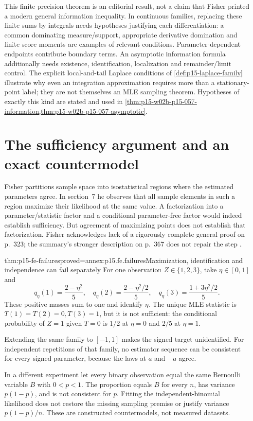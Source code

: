 This finite precision theorem is an editorial result, not a claim that
Fisher printed a modern general information inequality. In continuous
families, replacing these finite sums by integrals needs hypotheses
justifying each differentiation: a common dominating measure/support,
appropriate derivative domination and finite score moments are examples
of relevant conditions. Parameter-dependent endpoints contribute boundary
terms. An asymptotic information formula additionally needs existence,
identification, localization and remainder/limit control. The explicit
local-and-tail Laplace conditions of \cref{def:p15-laplace-family}
illustrate why even an integration approximation requires more than a
stationary-point label; they are not themselves an MLE sampling theorem.
Hypotheses of exactly this kind are stated and used in
\cref{thm:p15-w02b-p15-057-information,thm:p15-w02b-p15-057-asymptotic}.

\section{The sufficiency argument and an exact countermodel}

Fisher partitions sample space into isostatistical regions where the
estimated parameters agree. In section~7 he observes that all sample
elements in such a region maximize their likelihood at the same value.
A factorization into a parameter/statistic factor and a conditional
parameter-free factor would indeed establish sufficiency. But agreement
of maximizing points does not establish that factorization. Fisher
acknowledges lack of a rigorously complete general proof on p.~323;
the summary's stronger description on p.~367 does not repair the step
\cite[pp.~323,330--331,367]{Fisher1922Foundations}.

\begin{hbtheorem}{thm:p15-fe-failures}{proved=annex:p15.fe.failures}{Maximization, identification and independence can fail separately}
For one observation \(Z\in\{1,2,3\}\), take \(\eta\in[0,1]\) and
\[
 q_\eta(1)=\frac{2-\eta^2}{5},\quad
 q_\eta(2)=\frac{2-\eta^2/2}{5},\quad
 q_\eta(3)=\frac{1+3\eta^2/2}{5}.
\]
These positive masses sum to one and identify \(\eta\).
The unique MLE statistic is \(T(1)=T(2)=0,T(3)=1\), but it is not
sufficient: the conditional probability of \(Z=1\) given \(T=0\)
is \(1/2\) at \(\eta=0\) and \(2/5\) at \(\eta=1\).

Extending the same family to \([-1,1]\) makes the signed target
unidentified. For independent repetitions of that family, no estimator
sequence can be consistent for every signed
parameter, because the laws at \(a\) and \(-a\) agree.

In a different experiment let every binary observation equal the same
Bernoulli variable \(B\) with \(0<p<1\). The proportion equals \(B\)
for every \(n\), has variance \(p(1-p)\), and is not consistent for
\(p\). Fitting the independent-binomial likelihood does not restore
the missing sampling premise or justify variance \(p(1-p)/n\).
These are constructed countermodels, not measured datasets.
\end{hbtheorem}

